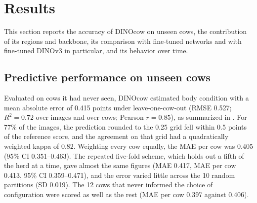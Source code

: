 \section{Results}
\label{sec:results}

\begin{cambio}
This section reports the accuracy of DINOcow on unseen cows, the contribution of its regions and backbone, its comparison with fine-tuned networks and with fine-tuned DINOv3 in particular, and its behavior over time.
\end{cambio}

\subsection{Predictive performance on unseen cows}
\label{sec:res-accuracy}
Evaluated on cows it had never seen, DINOcow estimated body condition with a mean absolute error of 0.415 points under leave-one-cow-out (RMSE 0.527; $R^2 = 0.72$ over images and over cows; Pearson $r = 0.85$), as summarized in .
For 77\% of the images, the prediction rounded to the 0.25 grid fell within 0.5 points of the reference score, and the agreement on that grid had a quadratically weighted kappa of 0.82.
Weighting every cow equally, the MAE per cow was 0.405 (95\% CI 0.351--0.463).
The repeated five-fold scheme, which holds out a fifth of the herd at a time, gave almost the same figures (MAE 0.417, MAE per cow 0.413, 95\% CI 0.359--0.471), and the error varied little across the 10 random partitions (SD 0.019).
The 12 cows that never informed the choice of configuration were scored as well as the rest (MAE per cow 0.397 against 0.406).

\begin{table}[!htbp]
  \centering
  \caption{Accuracy of DINOcow on unseen cows under both validation schemes. The 10 repetitions of the five-fold scheme are averaged per image before scoring.}
  \label{tab:main}
\end{table}

